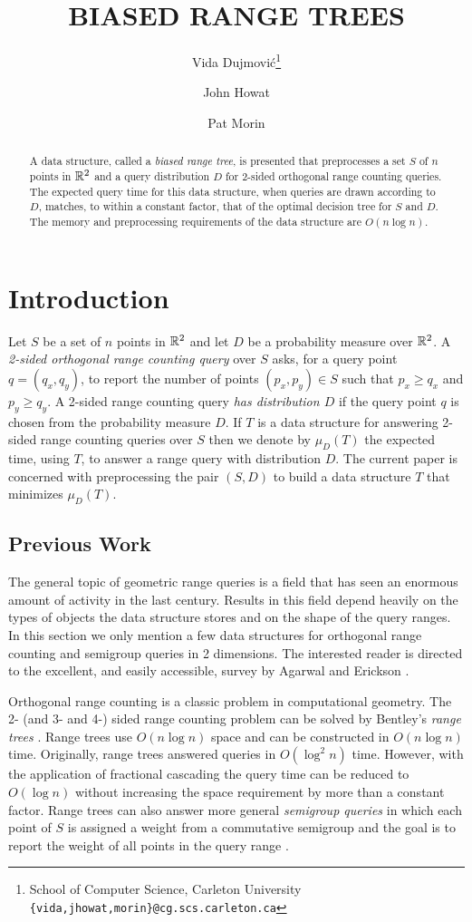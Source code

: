 \documentclass[charterfonts]{patmorin}
\title{\MakeUppercase{Biased Range Trees}}
\author{Vida Dujmovi\'c\thanks{School of Computer Science,
	Carleton University
\texttt{\{vida,jhowat,morin\}@cg.scs.carleton.ca}}
	\and John Howat\footnotemark[1]
	\and Pat Morin\footnotemark[1]}
\date{}
\begin{document}
\maketitle
\begin{abstract}
A data structure, called a \emph{biased range tree}, is presented that
preprocesses a set $S$ of $n$ points in $\mathbb{R}^2$ and a query
distribution $D$ for 2-sided orthogonal range counting queries.  The
expected query time for this data structure, when queries are drawn
according to $D$, matches, to within a constant factor, that of the
optimal decision tree for $S$ and $D$.   The memory and preprocessing
requirements of the data structure are $O(n\log n)$.
\end{abstract}

\section{Introduction}

Let $S$ be a set of $n$ points in $\mathbb{R}^2$ and let $D$ be a probability
measure over $\mathbb{R}^2$.  A \emph{2-sided orthogonal range counting query}
over $S$ asks, for a query point $q=(q_x,q_y)$, to report the number
of points $(p_x,p_y)\in S$ such that $p_x \ge q_x$ and $p_y \ge q_y$.
A 2-sided range counting query \emph{has distribution $D$} if the
query point $q$ is chosen from the probability measure $D$.  If $T$ is
a data structure for answering 2-sided range counting queries over $S$
then we denote by $\mu_D(T)$ the expected time, using $T$, to answer a
range query with distribution $D$.  The current paper is concerned
with preprocessing the pair $(S,D)$ to build a data structure $T$ that
minimizes $\mu_D(T)$.

\subsection{Previous Work}

The general topic of geometric range queries is a field that has seen
an enormous amount of activity in the last century.  Results in this
field depend heavily on the types of objects the data structure stores
and on the shape of the query ranges.  In this section we only mention
a few data structures for orthogonal range counting and semigroup
queries in 2 dimensions.  The interested reader is directed to the
excellent, and easily accessible, survey by Agarwal and Erickson
\cite{ea99}.

Orthogonal range counting is a classic problem in computational
geometry.  The 2- (and 3- and 4-) sided range counting problem can be
solved by Bentley's \emph{range trees} \cite{ae42}.  Range trees use
$O(n\log n)$ space and can be constructed in $O(n\log n)$ time.
Originally, range trees answered queries in $O(\log^2 n)$ time.
However, with the application of fractional cascading
\cite{ae76,ae196} the query time can be reduced to $O(\log n)$ without
increasing the space requirement by more than a constant factor.
Range trees can also answer more general \emph{semigroup queries} in
which each point of $S$ is assigned a weight from a commutative
semigroup and the goal is to report the weight of all points in the
query range \cite{ae133,ae292}.
\end{document}
